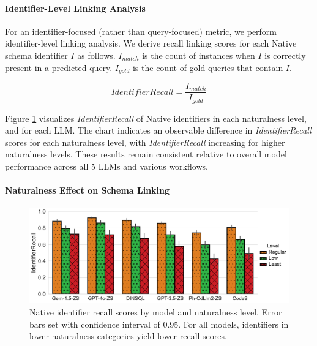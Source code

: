 \paragraph{\textbf{Identifier-Level Linking Analysis}}

For an identifier-focused (rather than query-focused) metric, we perform identifier-level linking analysis.
We derive recall linking scores for each Native schema identifier $I$ as follows. 
$I_{match}$ is the count of instances when $I$ is correctly present in a predicted query. 
$I_{gold}$ is the count of gold queries that contain $I$.

\begin{equation}
  \label{eq:identifier-recall}
  IdentifierRecall = \frac{I_{match}}{I_{gold}}
\end{equation}

Figure \ref{fig:identifier-recall} visualizes \emph{IdentifierRecall} of Native identifiers in each naturalness level, and for each LLM.
The chart indicates an observable difference in \emph{IdentifierRecall} scores for each naturalness level, with \emph{IdentifierRecall} increasing for higher naturalness levels.
These results remain consistent relative to overall model performance across all 5 LLMs and various workflows.

\paragraph{\textbf{Naturalness Effect on Schema Linking}}

\begin{figure}
  \centering
  \includegraphics[width=\figwidthmod\linewidth]{figures/identifier-recall.pdf}
  \caption{Native identifier recall scores by model and naturalness level. Error bars set with confidence interval of 0.95. For all models, identifiers in lower naturalness categories yield lower recall scores.}
  \label{fig:identifier-recall}
\end{figure}

